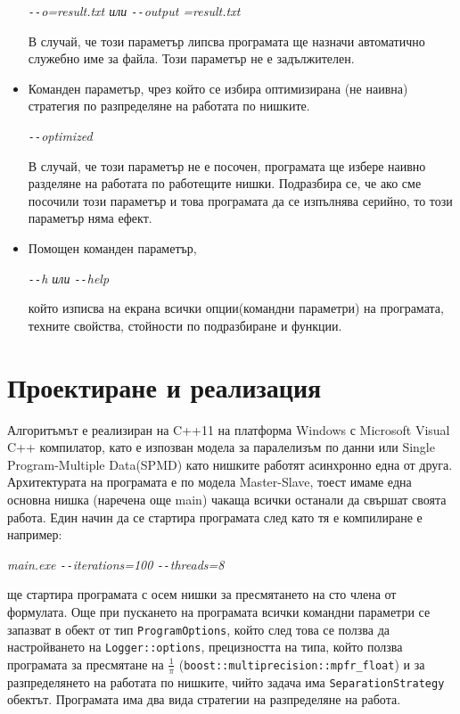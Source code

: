 \documentclass[a4paper,english]{article}
\begin{document}
\begin{itemize}
    \begin{center}
        \textit{\texttt{-{}-}o=result.txt или \texttt{-{}-}output =result.txt}
    \end{center}
    
    В случай, че този параметър липсва програмата ще назначи автоматично служебно име за файла. Този параметър не е задължителен.
    
    \item Команден параметър, чрез който се избира оптимизирана (не наивна) стратегия по разпределяне на работата по нишките.
    
    \begin{center}
        \textit{\texttt{-{}-}optimized}
    \end{center}
    
    В случай, че този параметър не е посочен, програмата ще избере наивно разделяне на работата по работещите нишки. Подразбира се, че ако сме посочили този параметър и това програмата да се изпълнява серийно, то този параметър няма ефект.
    
    \item Помощен команден параметър,
    
    \begin{center}
        \textit{\texttt{-{}-}h или \texttt{-{}-}help}
    \end{center}
    
    който изписва на екрана всички опции(командни параметри) на програмата, техните свойства, стойности по подразбиране и функции.
\end{itemize}


\section{Проектиране и реализация}
    Алгоритъмът е реализиран на C++11 на платформа Windows с Microsoft Visual C++ компилатор, като е изпозван модела за паралелизъм по данни или Single Program-Multiple Data(SPMD) като нишките работят асинхронно една от друга.\hfill
    Архитектурата на програмата е по модела Master-Slave, тоест имаме една основна нишка (наречена още main) чакаща всички останали да свършат своята работа.\hfill
    Един начин да се стартира програмата след като тя е компилиране е например:
    \begin{center}
        \textit{main.exe \texttt{-{}-}iterations=100 \texttt{-{}-}threads=8}
    \end{center}
    ще стартира програмата с осем нишки за пресмятането на сто члена от формулата.\hfill
    Още при пускането на програмата всички командни параметри се запазват в обект от тип \lstinline{ProgramOptions}, който след това се ползва да настройването на \lstinline{Logger::options}, прецизността на типа, който ползва програмата за пресмятане на \(\frac{1}{\pi}\) (\lstinline{boost::multiprecision::mpfr_float}) и за разпределянето на работата по нишките, чийто задача има \lstinline{SeparationStrategy} обектът.\hfill
    Програмата има два вида стратегии на разпределяне на работа.
    
\end{document}
